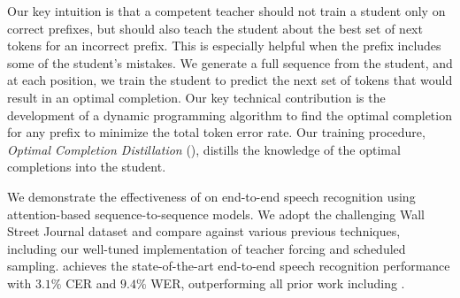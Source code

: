 {Our key intuition is that a competent teacher should not train a
student only on correct prefixes, but should also teach the student
about the best set of next tokens for an incorrect prefix. This is
especially helpful when the prefix includes some of the student's
mistakes. We generate a full sequence from the student, and at each
position, we train the student to predict the next set of tokens that
would result in an optimal completion. Our key technical contribution
is the development of a dynamic programming algorithm to find the
optimal completion for any prefix to minimize the total token error
rate. Our training procedure, {\em Optimal Completion Distillation}
(\acronym), distills the knowledge of the optimal completions into the
student.

We demonstrate the effectiveness of \acronym on end-to-end speech
recognition using attention-based sequence-to-sequence models.  We
adopt the challenging Wall Street Journal dataset and compare \acronym
against various previous techniques, including our well-tuned
implementation of teacher forcing and scheduled sampling. \acronym
achieves the state-of-the-art end-to-end speech recognition
performance with $3.1\%$ CER and $9.4\%$ WER, outperforming all prior
work
including \citep{bahdanau-icassp-2016,chorowski-interspeech-2017,chan-iclr-2017}.

}

